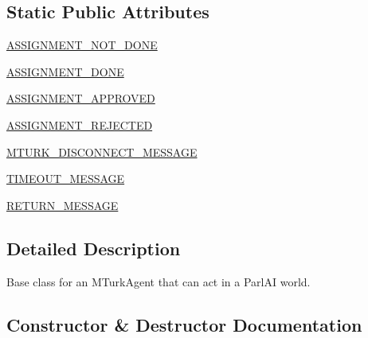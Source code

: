 \subsection*{Static Public Attributes}
\begin{DoxyCompactItemize}
\item 
\hyperlink{classparlai_1_1mturk_1_1core_1_1legacy__2018_1_1agents_1_1MTurkAgent_a1ef38f4dbd7d7666b54f78745ed03c0f}{A\+S\+S\+I\+G\+N\+M\+E\+N\+T\+\_\+\+N\+O\+T\+\_\+\+D\+O\+NE}
\item 
\hyperlink{classparlai_1_1mturk_1_1core_1_1legacy__2018_1_1agents_1_1MTurkAgent_ae4a70bd3098cbeb045666fd77ceb25cd}{A\+S\+S\+I\+G\+N\+M\+E\+N\+T\+\_\+\+D\+O\+NE}
\item 
\hyperlink{classparlai_1_1mturk_1_1core_1_1legacy__2018_1_1agents_1_1MTurkAgent_a2590f192e9c2e29f01fdbddca0618a1c}{A\+S\+S\+I\+G\+N\+M\+E\+N\+T\+\_\+\+A\+P\+P\+R\+O\+V\+ED}
\item 
\hyperlink{classparlai_1_1mturk_1_1core_1_1legacy__2018_1_1agents_1_1MTurkAgent_acd491e209dba5d0b7a06e0c58a38bb1a}{A\+S\+S\+I\+G\+N\+M\+E\+N\+T\+\_\+\+R\+E\+J\+E\+C\+T\+ED}
\item 
\hyperlink{classparlai_1_1mturk_1_1core_1_1legacy__2018_1_1agents_1_1MTurkAgent_a36476faaea21b47f065fba9a140dd5ee}{M\+T\+U\+R\+K\+\_\+\+D\+I\+S\+C\+O\+N\+N\+E\+C\+T\+\_\+\+M\+E\+S\+S\+A\+GE}
\item 
\hyperlink{classparlai_1_1mturk_1_1core_1_1legacy__2018_1_1agents_1_1MTurkAgent_a68c34b1ba222914c67440a1c1d26b09a}{T\+I\+M\+E\+O\+U\+T\+\_\+\+M\+E\+S\+S\+A\+GE}
\item 
\hyperlink{classparlai_1_1mturk_1_1core_1_1legacy__2018_1_1agents_1_1MTurkAgent_a29d3024b464db036df53d403e8b0abd9}{R\+E\+T\+U\+R\+N\+\_\+\+M\+E\+S\+S\+A\+GE}
\end{DoxyCompactItemize}


\subsection{Detailed Description}
\begin{DoxyVerb}Base class for an MTurkAgent that can act in a ParlAI world.
\end{DoxyVerb}
 

\subsection{Constructor \& Destructor Documentation}
\mbox{\label{classparlai_1_1mturk_1_1core_1_1legacy__2018_1_1agents_1_1MTurkAgent_a87dcf45fff05aac86acf6d3dfbef9557}} 
